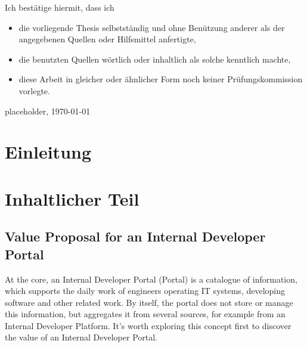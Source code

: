 \documentclass[a4paper,12pt]{article}
\begin{document}
    Ich bestätige hiermit, dass ich
    \begin{itemize}
        \item die vorliegende Thesis selbstständig und ohne Benützung anderer als der angegebenen Quellen oder Hilfsmittel anfertigte,
        \item die benutzten Quellen wörtlich oder inhaltlich als solche kenntlich machte,
        \item diese Arbeit in gleicher oder ähnlicher Form noch keiner Prüfungskommission vorlegte.
    \end{itemize}
    placeholder, \today\newline

    \pagebreak

    \section{Einleitung}


    \section{Inhaltlicher Teil}

    \subsection{Value Proposal for an Internal Developer Portal}
    At the core, an Internal Developer Portal (Portal) is a catalogue of information, which supports the daily work of
    engineers operating IT systems, developing software and other related work.
    By itself, the portal does not store or manage this information, but aggregates it from several sources, for example from an Internal Developer Platform.
    It's worth exploring this concept first to discover the value of an Internal Developer Portal.
\end{document}
